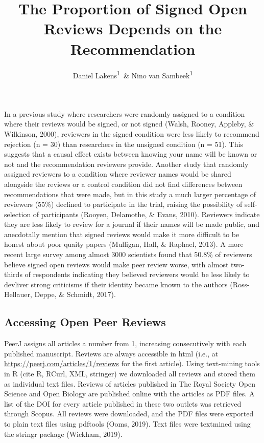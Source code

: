 \documentclass[,jou, a4paper,floatsintext]{apa6}
\title{The Proportion of Signed Open Reviews Depends on the Recommendation}
\author{Daniel Lakens\textsuperscript{1}~\& Nino van Sambeek\textsuperscript{1}}
\date{}
\affiliation{
\vspace{0.5cm}
\textsuperscript{1} Eindhoven University of Technology, The Netherlands}
\begin{document}
\maketitle

In a previous study where researchers were randomly assigned to a condition where their reviews would be signed, or not signed (Walsh, Rooney, Appleby, \& Wilkinson, 2000), reviewers in the signed condition were less likely to recommend rejection (n = 30) than researchers in the unsigned condition (n = 51). This suggests that a causal effect exists between knowing your name will be known or not and the recommendation reviewers provide. Another study that randomly assigned reviewers to a condition where reviewer names would be shared alongside the reviews or a control condition did not find differences between recommendations that were made, but in this study a much larger percentage of reviewers (55\%) declined to participate in the trial, raising the possibility of self-selection of participants (Rooyen, Delamothe, \& Evans, 2010). Reviewers indicate they are less likely to review for a journal if their names will be made public, and anecdotally mention that signed reviews would make it more difficult to be honest about poor quaity papers (Mulligan, Hall, \& Raphael, 2013). A more recent large survey among almost 3000 scientists found that 50.8\% of reviewers believe signed open reviews would make peer review worse, with almost two-thirds of respondents indicating they believed reviewers would be less likely to devliver strong criticisms if their identity became known to the authors (Ross-Hellauer, Deppe, \& Schmidt, 2017).

\hypertarget{accessing-open-peer-reviews}{%
\subsection{Accessing Open Peer Reviews}\label{accessing-open-peer-reviews}}

PeerJ assigns all articles a number from 1, increasing consecutively with each published manuscript. Reviews are always accessible in html (i.e., at \url{https://peerj.com/articles/1/reviews} for the first article). Using text-mining tools in R (cite R, RCurl, XML, stringer) we downloaded all reviews and stored them as individual text files. Reviews of articles published in The Royal Society Open Science and Open Biology are published online with the articles as PDF files. A list of the DOI for every article published in these two outlets was retrieved through Scopus. All reviews were downloaded, and the PDF files were exported to plain text files using pdftools (Ooms, 2019). Text files were textmined using the stringr package (Wickham, 2019).
\end{document}
